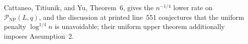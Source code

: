 Cattaneo, Titiunik, and Yu, Theorem~6, gives the \(n^{-1/4}\) lower rate on \(\mathcal P_{\mathrm{NP}}(L,q)\), and the discussion at printed line~551 conjectures that the uniform penalty \(\log^{1/4}n\) is unavoidable; their uniform upper theorem additionally imposes Assumption~2.